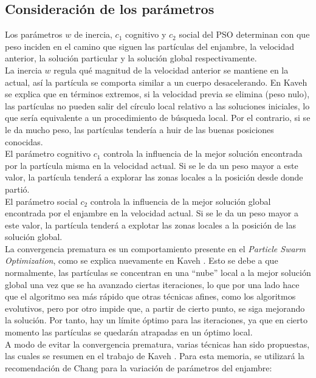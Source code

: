 \subsection{Consideración de los parámetros}
Los parámetros $w$ de inercia, $c_1$ cognitivo y $c_2$ social del PSO determinan con que peso inciden en el camino que siguen las partículas del enjambre, la velocidad anterior, la solución particular y la solución global respectivamente.\\ 
La inercia $w$ regula qué magnitud de la velocidad anterior se mantiene en la actual, así la partícula se comporta similar a un cuerpo desacelerando. En Kaveh \cite{Psoexplain14} se explica que en términos extremos, si la velocidad previa se elimina (peso nulo), las partículas no pueden salir del círculo local relativo a las soluciones iniciales, lo que sería equivalente a un procedimiento de búsqueda local.  Por el contrario, si se le da mucho peso, las partículas tendería a huir de las buenas posiciones conocidas.\\
El parámetro cognitivo $c_1$ controla la influencia de la mejor solución encontrada por la partícula misma en la velocidad actual. Si se le da un peso mayor a este valor, la partícula tenderá a explorar las zonas locales a la posición desde donde partió.\\
El parámetro social $c_2$ controla la influencia de la mejor solución global encontrada por el enjambre en la velocidad actual. Si se le da un peso mayor a este valor, la partícula tenderá a explotar las zonas locales a la posición de las solución global.\\
La convergencia prematura es un comportamiento presente en el \emph{Particle Swarm Optimization}, como se explica nuevamente en Kaveh \cite{Psoexplain14}. Esto se debe a que normalmente, las partículas se concentran en una ``nube'' local a la mejor solución global una vez que se ha avanzado ciertas iteraciones, lo que por una lado hace que el algoritmo sea más rápido que otras técnicas afines, como los algoritmos evolutivos, pero por otro impide que, a partir de cierto punto, se siga mejorando la solución. Por tanto, hay un límite óptimo para las iteraciones, ya que en cierto momento las partículas se quedarán atrapadas en un óptimo local.\\
A modo de evitar la convergencia prematura, varias técnicas han sido propuestas, las cuales se resumen en el trabajo de Kaveh \cite{Psoexplain14}. Para esta memoria, se utilizará la recomendación de Chang \cite{Chang10_2} para la variación de parámetros del enjambre:
